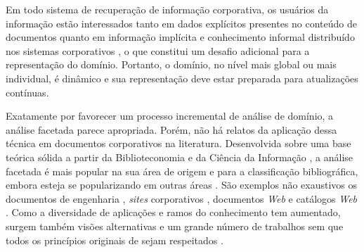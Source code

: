 Em todo sistema de recuperação de informação corporativa, os usuários da informação estão interessados tanto em dados explícitos presentes no conteúdo de documentos \cite{gardin1973} quanto em informação implícita e conhecimento informal distribuído nos sistemas corporativos \cite{dealwis2001singapore,choo2008,marcella2012,nunes2006,ofarrill2010}, o que constitui um desafio adicional para a representação do domínio. Portanto, o domínio, no nível mais global ou mais individual, é dinâmico e sua representação deve estar preparada para atualizações contínuas.

Exatamente por favorecer um processo incremental de análise de domínio, a análise facetada parece apropriada. Porém, não há relatos da aplicação dessa técnica em documentos corporativos na literatura. Desenvolvida sobre uma base teórica sólida a partir da Biblioteconomia e da Ciência da Informação \cite{garfield1984}, a análise facetada é mais popular na sua área de origem e para a classificação bibliográfica, embora esteja se popularizando em outras áreas \cite{labarre2010}. São exemplos não exaustivos os documentos de engenharia \cite{giess2008generation,wild2009describing}, \textit{sites} corporativos \cite{wang2008using}, documentos \textit{Web} \cite{hong06,vickery2008faceted} e catálogos \textit{Web} \cite{sacco2006}. Como a diversidade de aplicações e ramos do conhecimento tem aumentado, surgem também visões alternativas e um grande número de trabalhos sem que todos os princípios originais de  sejam respeitados \cite{spiteri98simplified,wild2009describing}.






